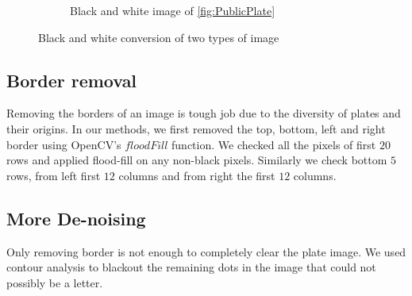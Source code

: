 \documentclass{standalone}
\begin{document}
\begin{figure}
\begin{subfigure}{.5\textwidth}
  \caption{Black and white image of \ref{fig:PublicPlate}}
\end{subfigure}
\caption{Black and white conversion of two types of image}
\label{fig:BlackAndWhite}
\end{figure}

\subsection{Border removal}
Removing the borders of an image is tough job due to the diversity of plates and their origins. In our methods, we first removed the top, bottom, left and right border using OpenCV's $floodFill$ function. We checked all the pixels of first $20$ rows and applied flood-fill on any non-black pixels. Similarly we check bottom $5$ rows, from left first $12$ columns and from right the first $12$ columns.

\subsection{More De-noising}
Only removing border is not enough to completely clear the plate image. We used contour analysis to blackout the remaining dots in the image that could not possibly be a letter. 
\end{document}
